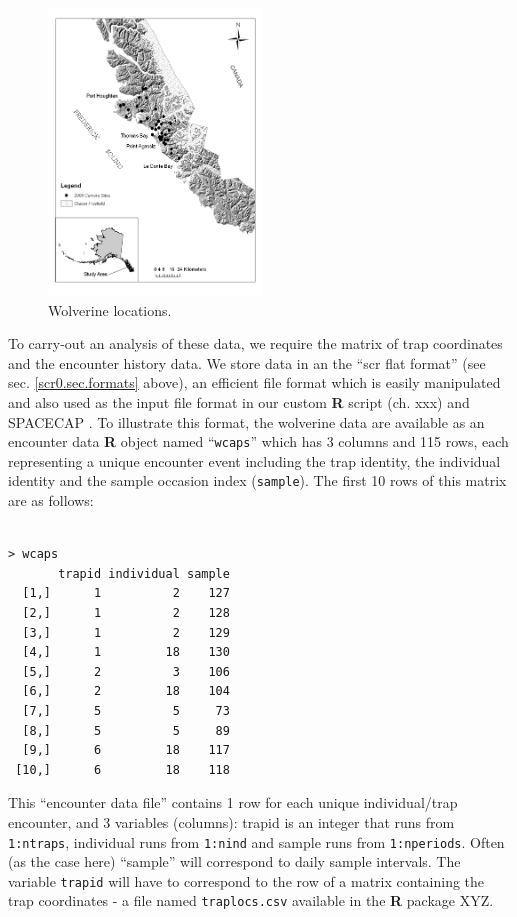 \begin{figure}
\begin{center}
\includegraphics[height=3in]{figs/wolverinelocs}
\end{center}
\caption{Wolverine locations.}
\label{scr0.fig.wolverinelocs}
\end{figure}

To carry-out an analysis of these data, we require the matrix of trap
coordinates and the encounter history data.  We store data in an
the
``scr flat format'' (see sec.
\ref{scr0.sec.formats}
 above), an
efficient file format which is easily manipulated and also used as the
input file format in our custom {\bf R} script (ch. xxx) and SPACECAP \citep{gopalaswamy_etal:2012}.
 To illustrate this
format, the wolverine data are available as an encounter data {\bf R} object
named ``\mbox{\tt wcaps}'' which has 3 columns and 115 rows, each representing a
unique encounter event including the trap identity, the individual
identity and the sample occasion index (\mbox{\tt sample}).  
The first 10 rows of this matrix are as
follows:
\begin{verbatim}

> wcaps
       trapid individual sample
  [1,]      1          2    127
  [2,]      1          2    128
  [3,]      1          2    129
  [4,]      1         18    130
  [5,]      2          3    106
  [6,]      2         18    104
  [7,]      5          5     73
  [8,]      5          5     89
  [9,]      6         18    117
 [10,]      6         18    118

\end{verbatim}

This ``encounter data file'' contains 1 row for each unique
individual/trap encounter, and 3 variables (columns): trapid is an
integer that runs from \mbox{\tt 1:ntraps}, individual runs from
\mbox{\tt 1:nind} and
sample runs from \mbox{\tt 1:nperiods}. Often (as the case here) ``sample'' will
correspond to daily sample intervals. The variable \mbox{\tt trapid} will have to
correspond to the row of a matrix containing the trap coordinates - a
file named \mbox{\tt traplocs.csv} available in the {\bf R} package XYZ.

